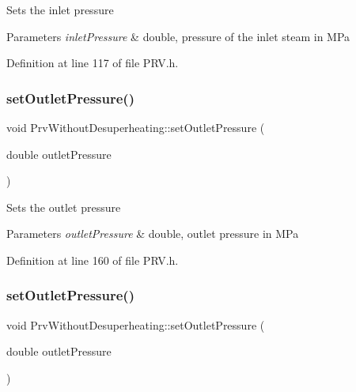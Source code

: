 Sets the inlet pressure


\begin{DoxyParams}{Parameters}
{\em inlet\+Pressure} & double, pressure of the inlet steam in M\+Pa \\
\hline
\end{DoxyParams}


Definition at line 117 of file P\+R\+V.\+h.

\mbox{\label{class_prv_without_desuperheating_a0f2a4597b58390e5c4a7c75b38bbebbc}} 
\subsubsection{\texorpdfstring{set\+Outlet\+Pressure()}{setOutletPressure()}\hspace{0.1cm}{\footnotesize\ttfamily [1/3]}}
{\footnotesize\ttfamily void Prv\+Without\+Desuperheating\+::set\+Outlet\+Pressure (\begin{DoxyParamCaption}\item[{double}]{outlet\+Pressure }\end{DoxyParamCaption})\hspace{0.3cm}{\ttfamily [inline]}}

Sets the outlet pressure


\begin{DoxyParams}{Parameters}
{\em outlet\+Pressure} & double, outlet pressure in M\+Pa \\
\hline
\end{DoxyParams}


Definition at line 160 of file P\+R\+V.\+h.

\mbox{\label{class_prv_without_desuperheating_a0f2a4597b58390e5c4a7c75b38bbebbc}} 
\subsubsection{\texorpdfstring{set\+Outlet\+Pressure()}{setOutletPressure()}\hspace{0.1cm}{\footnotesize\ttfamily [2/3]}}
{\footnotesize\ttfamily void Prv\+Without\+Desuperheating\+::set\+Outlet\+Pressure (\begin{DoxyParamCaption}\item[{double}]{outlet\+Pressure }\end{DoxyParamCaption})\hspace{0.3cm}{\ttfamily [inline]}}


